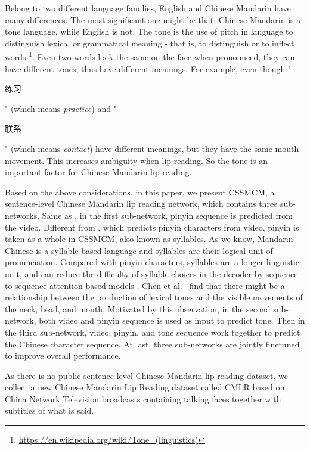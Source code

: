 \documentclass[sigconf]{acmart}
\begin{document}
Belong to two different language families, English and Chinese Mandarin have many differences. The most significant one might be that: Chinese Mandarin is a tone language, while English is not. The tone is the use of pitch in language to distinguish lexical or grammatical meaning - that is, to distinguish or to inflect words \footnote{\url{https://en.wikipedia.org/wiki/Tone\_(linguistics)}}. Even two words look the same on the face when pronounced, they can have different tones, thus have different meanings. For example, even though "\begin{CJK*}{UTF8}{gbsn}练习\end{CJK*}" (which means \textit{practice}) and "\begin{CJK*}{UTF8}{gbsn}联系\end{CJK*}" (which means \textit{contact}) have different meanings, but they have the same mouth movement. This increases ambiguity when lip reading. So the tone is an important factor for Chinese Mandarin lip reading.

Based on the above considerations, in this paper, we present CSSMCM, a sentence-level Chinese Mandarin lip reading network, which contains three sub-networks. Same as \cite{zhang2019understanding}, in the first sub-network, pinyin sequence is predicted from the video. Different from \cite{zhang2019understanding}, which predicts pinyin characters from video, pinyin is taken as a whole in CSSMCM, also known as syllables. As we know, Mandarin Chinese is a syllable-based language and syllables are their logical unit of pronunciation. Compared with pinyin characters, syllables are a longer linguistic unit, and can reduce the difficulty of syllable choices in the decoder by sequence-to-sequence attention-based models \cite{zhou2018syllable}. Chen et al.~\cite{chen2008seeing} find that there might be a relationship between the production of lexical tones and the visible movements of the neck, head, and mouth. Motivated by this observation, in the second sub-network, both video and pinyin sequence is used as input to predict tone. Then in the third sub-network, video, pinyin, and tone sequence work together to predict the Chinese character sequence. At last, three sub-networks are jointly finetuned to improve overall performance.

As there is no public sentence-level Chinese Mandarin lip reading dataset, we collect a new Chinese Mandarin Lip Reading dataset called CMLR based on China Network Television broadcasts containing talking faces together with subtitles of what is said.
\end{document}
